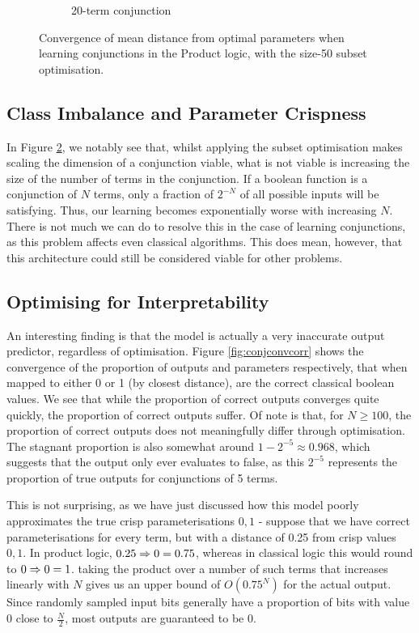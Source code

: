 \begin{figure}[h]
\begin{subfigure}[b]{0.30\textwidth}
        \caption{20-term conjunction}
        \label{fig:conjconvkeepn20}
    \end{subfigure}
       \caption{Convergence of mean distance from optimal parameters when learning conjunctions in the Product logic, with the size-50 subset optimisation.}
       \label{fig:conjconvkeepn}
\end{figure}

\subsection{Class Imbalance and Parameter Crispness}

In Figure \ref{fig:conjconvkeepn}, we notably see that, whilst applying the subset optimisation makes scaling the dimension of a conjunction viable, what is not viable is increasing the size of the number of terms in the conjunction. If a boolean function is a conjunction of $N$ terms, only a fraction of $2^{-N}$ of all possible inputs will be satisfying. Thus, our learning becomes exponentially worse with increasing $N$. There is not much we can do to resolve this in the case of learning conjunctions, as this problem affects even classical algorithms. This does mean, however, that this architecture could still be considered viable for other problems.

\subsection{Optimising for Interpretability}

An interesting finding is that the model is actually a very inaccurate output predictor, regardless of optimisation. Figure \ref{fig:conjconvcorr} shows the convergence of the proportion of outputs and parameters respectively, that when mapped to either 0 or 1 (by closest distance), are the correct classical boolean values. We see that while the proportion of correct outputs converges quite quickly, the proportion of correct outputs suffer. Of note is that, for $N \geq 100$, the proportion of correct outputs does not meaningfully differ through optimisation. The stagnant proportion is also somewhat around $1 - 2^{-5} \approx 0.968$, which suggests that the output only ever evaluates to false, as this $2^{-5}$ represents the proportion of true outputs for conjunctions of 5 terms. 

This is not surprising, as we have just discussed how this model poorly approximates the true crisp parameterisations $0,1$ - suppose that we have correct parameterisations for every term, but with a distance of 0.25 from crisp values $0, 1$. In product logic, $0.25 \Rightarrow 0 = 0.75$, whereas in classical logic this would round to $0 \Rightarrow 0 = 1$. taking the product over a number of such terms that increases linearly with $N$ gives us an upper bound of $O(0.75^N)$ for the actual output. Since randomly sampled input bits generally have a proportion of bits with value $0$ close to $\frac{N}{2}$, most outputs are guaranteed to be $0$. 

